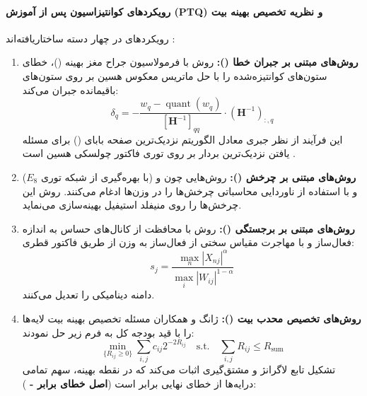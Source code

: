 \paragraph*{رویکردهای کوانتیزاسیون پس از آموزش (PTQ) و نظریه تخصیص بهینه بیت}
رویکردهای  در چهار دسته ساختاریافته‌اند \cite{zhao2025benchmarking}:
\begin{enumerate}
    \item \textbf{روش‌های مبتنی بر جبران خطا ():} روش  \cite{frantar2023gptq} با فرمولاسیون جراح مغز بهینه ()، خطای ستون‌های کوانتیزه‌شده را با حل ماتریس معکوس هسین بر روی ستون‌های باقیمانده جبران می‌کند:
    \begin{equation}
        \delta_q = -\frac{w_q - \operatorname{quant}(w_q)}{[\mathbf{H}^{-1}]_{qq}} \cdot (\mathbf{H}^{-1})_{:, q}
    \end{equation}
    این فرآیند از نظر جبری معادل الگوریتم نزدیک‌ترین صفحه بابای () برای مسئله یافتن نزدیک‌ترین بردار بر روی توری فاکتور چولسکی هسین است \cite{chen2026geometry, birnick2026lattice}.
    \item \textbf{روش‌های مبتنی بر چرخش ():} روش‌هایی چون  \cite{chee2023quip} و  \cite{tseng2024quipsharp} (با بهره‌گیری از شبکه توری $E_8$) و  \cite{ashkboos2024quarot} با استفاده از ناوردایی محاسباتی  چرخش‌ها را در وزن‌ها ادغام می‌کنند. روش  \cite{liu2025spinquant} این چرخش‌ها را روی منیفلد استیفیل بهینه‌سازی می‌نماید.
    \item \textbf{روش‌های مبتنی بر برجستگی ():} روش  \cite{lin2024awq} با محافظت از کانال‌های حساس به اندازه فعال‌ساز و  \cite{xiao2023smoothquant} با مهاجرت مقیاس سختی از فعال‌ساز به وزن از طریق فاکتور قطری:
    \begin{equation}
        s_j = \frac{\max_n |X_{nj}|^\alpha}{\max_i |W_{ij}|^{1-\alpha}}
    \end{equation}
    دامنه دینامیکی را تعدیل می‌کنند.
    \item \textbf{روش‌های تخصیص محدب بیت ():} ژانگ و همکاران \cite{zhang2025baq} مسئله تخصیص بهینه بیت لایه‌ها را با قید بودجه کل به فرم زیر حل نمودند:
    \begin{equation}
        \min_{\{R_{ij} \ge 0\}} \sum_{i,j} c_{ij} 2^{-2R_{ij}} \quad \text{s.t.} \quad \sum_{i,j} R_{ij} \le R_{\text{sum}}
    \end{equation}
    تشکیل تابع لاگرانژ و مشتق‌گیری اثبات می‌کند که در نقطه بهینه، سهم تمامی درایه‌ها از خطای نهایی برابر است (\textbf{اصل خطای برابر - }):

\end{enumerate}

